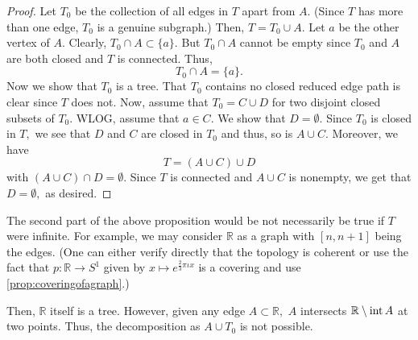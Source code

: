\documentclass[12pt]{article}
\begin{document}
\begin{proof}
	Let $T_0$ be the collection of all edges in $T$ apart from $A.$ (Since $T$ has more than one edge, $T_0$ is a genuine subgraph.) Then, $T = T_0 \cup A.$ Let $a$ be the other vertex of $A.$ Clearly, $T_0 \cap A \subset \{a\}.$ But $T_0 \cap A$ cannot be empty since $T_0$ and $A$ are both closed and $T$ is connected. Thus, 
	\begin{equation*} 
		T_0 \cap A = \{a\}.
	\end{equation*}
	Now we show that $T_0$ is a tree. That $T_0$ contains no closed reduced edge path is clear since $T$ does not. Now, assume that $T_0 = C \cup D$ for two disjoint closed subsets of $T_0.$ WLOG, assume that $a \in C.$ We show that $D = \emptyset.$ Since $T_0$ is closed in $T,$ we see that $D$ and $C$ are closed in $T_0$ and thus, so is $A \cup C.$ Moreover, we have
	\begin{equation*} 
		T = (A \cup C) \cup D
	\end{equation*}
	with $(A \cup C) \cap D = \emptyset.$ Since $T$ is connected and $A \cup C$ is nonempty, we get that $D = \emptyset,$ as desired.
\end{proof}

\begin{ex}
	The second part of the above proposition would be not necessarily be true if $T$ were infinite. For example, we may consider $\mathbb{R}$ as a graph with $\left[n, n + 1\right]$ being the edges. (One can either verify directly that the topology is coherent or use the fact that $p:\mathbb{R}\to S^1$ given by $x \mapsto e^{\frac{2}{3}\pi\iota x}$ is a covering and use \cref{prop:coveringofagraph}.)

	Then, $\mathbb{R}$ itself is a tree. However, given any edge $A \subset \mathbb{R},$ $A$ intersects $\mathbb{R}\setminus \operatorname{int} A$ at two points. Thus, the decomposition as $A \cup T_0$ is not possible.
\end{ex}
\end{document}

